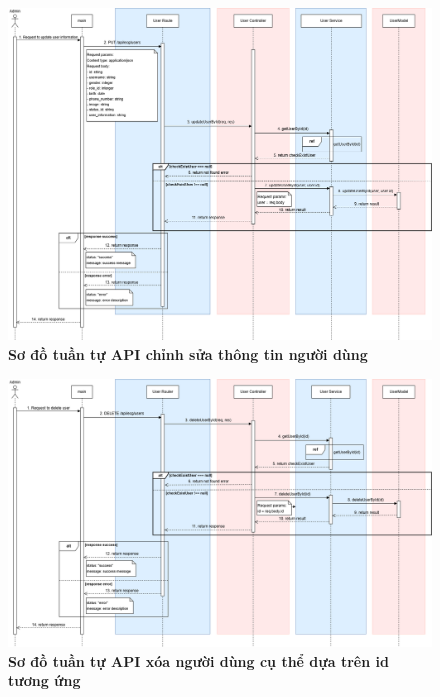 \begin{figure}[H]
	\centering
	\includegraphics[width=16cm]{Images/api_sequence/user/updateUserById.drawio.png}
	\caption[Sơ đồ tuần tự API chỉnh sửa thông tin người dùng]{\bfseries \fontsize{12pt}{0pt}\selectfont Sơ đồ tuần tự API chỉnh sửa thông tin người dùng}
	\label{sequence_diagram_update_user}
\end{figure}

\begin{figure}[H]
	\centering
	\includegraphics[width=16cm]{Images/api_sequence/user/deleteUserById.drawio.png}
	\caption[Sơ đồ tuần tự API xóa người dùng cụ thể dựa trên id tương ứng]{\bfseries \fontsize{12pt}{0pt}\selectfont Sơ đồ tuần tự API xóa người dùng cụ thể dựa trên id tương ứng}
	\label{sequence_diagram_delete_user}
\end{figure}

